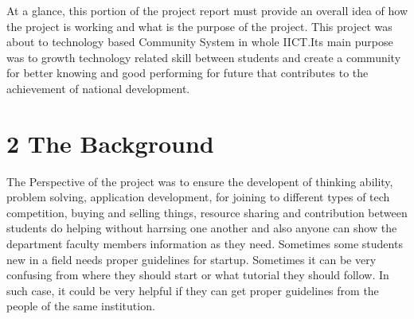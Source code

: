 \documentclass{standalone}
\begin{document}
At a glance, this portion of the project report must provide an overall idea of how the project is working and what is the purpose of the project. This project was about to technology based Community System in whole IICT.Its main purpose was to growth technology related skill between students and create a community for better knowing and good performing for future that contributes to the achievement of national development.\\[1.4cm]

\let\clearpage\relax\chapter*{2\hspace{0.3 cm} The Background}

The Perspective of the project was to ensure the developent of thinking ability, problem solving, application development, for joining to different types of tech competition, buying and selling things, resource sharing and contribution between students do helping without harrsing one another and also anyone can show the department faculty members information as they need. Sometimes some students new in a field needs proper guidelines for startup. Sometimes it can be very confusing from where they should start or what tutorial they should follow. In such case, it could be very helpful if they can get proper guidelines from the people of the same institution.\\[1.4cm]
\end{document}
